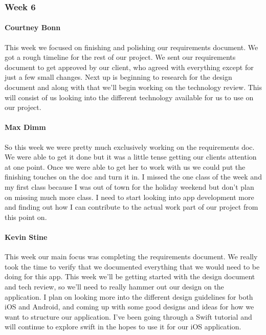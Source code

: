 		\subsubsection{Week 6}
		
			\paragraph{Courtney Bonn}
			This week we focused on finishing and polishing our requirements document. We got a rough timeline for the rest of our project. We sent our requirements document to get approved by our client, who agreed with everything except for just a few small changes. Next up is beginning to research for the design document and along with that we'll begin working on the technology review. This will consist of us looking into the different technology available for us to use on our project.

			\paragraph{Max Dimm}
			So this week we were pretty much exclusively working on the requirements doc. We were able to get it done but it was a little tense getting our clients attention at one point. Once we were able to get her to work with us we could put the finishing touches on the doc and turn it in. I missed the one class of the week and my first class because I was out of town for the holiday weekend but don't plan on missing much more class. I need to start looking into app development more and finding out how I can contribute to the actual work part of our project from this point on.
			
			\paragraph{Kevin Stine}
			This week our main focus was completing the requirements document. We really took the time to verify that we documented everything that we would need to be doing for this app. This week we'll be getting started with the design document and tech review, so we'll need to really hammer out our design on the application. I plan on looking more into the different design guidelines for both iOS and Android, and coming up with some good designs and ideas for how we want to structure our application. I've been going through a Swift tutorial and will continue to explore swift in the hopes to use it for our iOS application.
			
